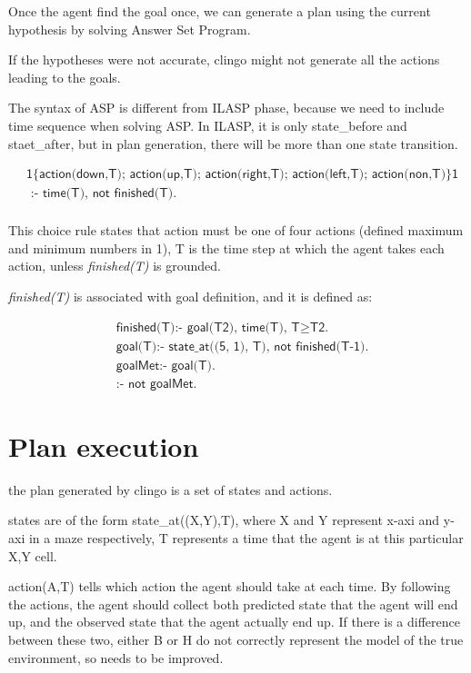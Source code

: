 Once the agent find the goal once, we can generate a plan using the current hypothesis by solving Answer Set Program. 

If the hypotheses were not accurate, clingo might not generate all the actions leading to the goals. 

The syntax of ASP is different from ILASP phase, because we need to include time sequence when solving ASP.
In ILASP, it is only state\_before and staet\_after, but in plan generation, there will be more than one state transition. 

\begin{equation}
\begin{split}
&\textsf{1\{action(down,T); action(up,T); action(right,T); action(left,T); action(non,T)\}1} \\
&\textsf{ :- time(T), not finished(T).}\\
\end{split}
\end{equation}

This choice rule states that action must be one of four actions (defined maximum and minimum numbers in 1), 
T is the time step at which the agent takes each action, unless \textit{finished(T)} is grounded. 

\textit{finished(T)} is associated with goal definition, and it is defined as:

\begin{equation}
\begin{split}
&\textsf{finished(T):- goal(T2), time(T), T} \geq \textsf{T2.}\\
&\textsf{goal(T):- state\_at((5, 1), T), not finished(T-1).}\\
&\textsf{goalMet:- goal(T).}\\
&\textsf{:- not goalMet.}
\end{split}
\end{equation}
    

\section{Plan execution}
\label{Plan execution}

the plan generated by clingo is a set of states and actions. 

states are of the form state\_at((X,Y),T), where X and Y represent x-axi and y-axi in a maze respectively, T represents a time that the agent is at 
this particular X,Y cell. 

action(A,T) tells which action the agent should take at each time. By following the actions, the agent should collect both predicted state that the 
agent will end up, and the observed state that the agent actually end up. If there is a difference between these two, either B or H do not correctly represent
the model of the true environment, so needs to be improved. 

